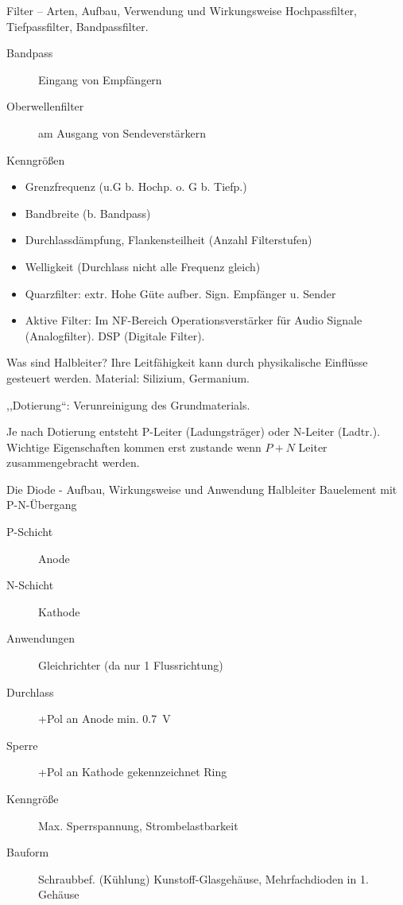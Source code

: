 \documentclass[avery5371,grid,frame,a4paper]{flashcards}
\newcommand{\card}[3]{
  \begin{flashcard}[{\chap} -- #1]{#2}#3\end{flashcard}
}
\begin{document}
\card{21}{Filter – Arten, Aufbau, Verwendung und Wirkungsweise}{
  \footnotesize
  Hochpassfilter, Tiefpassfilter, Bandpassfilter.

  \begin{description}
    \item[Bandpass] Eingang von Empfängern
    \item[Oberwellenfilter] am Ausgang von Sendeverstärkern
    \item[Kenngrößen]
  \end{description}
  {
    \scriptsize
      \begin{minipage}{0.5\textwidth}
        \begin{itemize}\itemsep0pt
          \item Grenzfrequenz (u.G b. Hochp. o. G b. Tiefp.)  %
          \item Bandbreite (b. Bandpass)
          \item Durchlassdämpfung, Flankensteilheit (Anzahl Filterstufen)
          \item Welligkeit (Durchlass nicht alle Frequenz gleich)
        \end{itemize}
      \end{minipage}
      \begin{minipage}{0.47\textwidth}
        \begin{itemize}\itemsep0pt
          \item Quarzfilter: extr. Hohe Güte aufber. Sign. Empfänger u. Sender
          \item Aktive Filter: Im NF-Bereich Operationsverstärker für Audio Signale (Analogfilter).
            DSP (Digitale Filter).
        \end{itemize}
      \end{minipage}
  }
}
\card{22}{Was sind Halbleiter?}{
  Ihre Leitfähigkeit kann durch physikalische Einflüsse gesteuert werden. Material: Silizium, Germanium.

  ,,Dotierung``: Verunreinigung des Grundmaterials.

  Je nach Dotierung entsteht P-Leiter (Ladungsträger) oder N-Leiter (Ladtr.).
  Wichtige Eigenschaften kommen erst zustande  wenn $P + N$ Leiter zusammengebracht werden.
}
\card{23}{Die Diode - Aufbau, Wirkungsweise und Anwendung}{
  \small
  Halbleiter Bauelement mit P-N-Übergang
  \begin{description}
    \item[P-Schicht] Anode
    \item[N-Schicht] Kathode
    \item[Anwendungen] Gleichrichter (da nur 1 Flussrichtung)
    \item[Durchlass] +Pol an Anode min. \SI{0,7}{\volt}
    \item[Sperre] +Pol an Kathode gekennzeichnet Ring
    \item[Kenngröße] Max. Sperrspannung, Strombelastbarkeit
    \item[Bauform] Schraubbef. (Kühlung) Kunstoff-Glasgehäuse, Mehrfachdioden in 1. Gehäuse
  \end{description}
}
\end{document}
